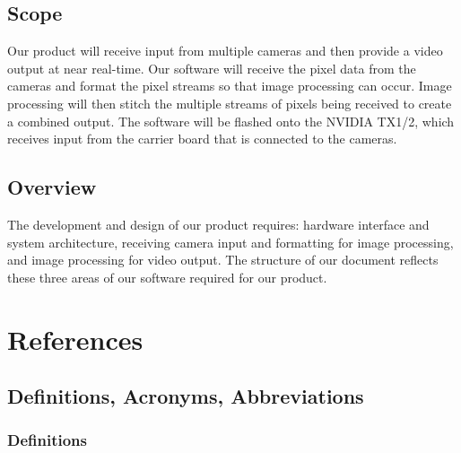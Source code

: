 \documentclass[letterpaper,10pt,serif,draftclsnofoot,onecolumn,compsoc,titlepage]{IEEEtran}
\begin{document}
\subsection{Scope}

Our product will receive input from multiple cameras and then provide a video output at 
near real-time. Our software will receive the pixel data from the cameras and format 
the pixel streams so that image processing can occur. Image processing will then stitch 
the multiple streams of pixels being received to create a combined output. The software 
will be flashed onto the NVIDIA TX1/2, which receives input from the carrier 
board that is connected to the cameras. \\

\subsection{Overview}

The development and design of our product requires: hardware interface and system 
architecture, receiving camera input and formatting for image processing, and image 
processing for video output. The structure of our document reflects these three areas 
of our software required for our product. \\ 

\newpage
\section{References}




\subsection{Definitions, Acronyms, Abbreviations}

\subsubsection{Definitions}
\end{document}
